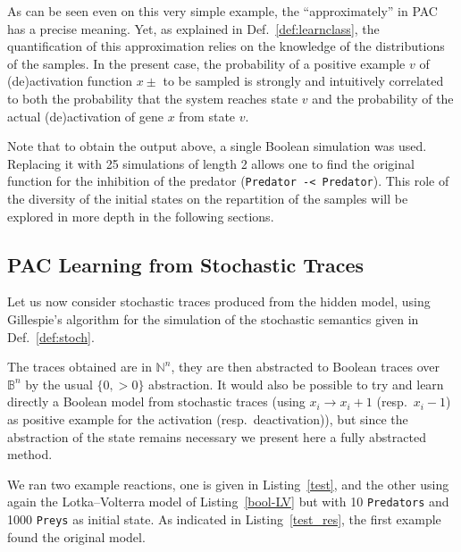 \documentclass{llncs}
\newcommand{\lra}{\longrightarrow}
\begin{document}
As can be seen even on this very simple example, the ``approximately'' in PAC has a precise meaning. Yet, as explained in Def.~\ref{def:learnclass}, the quantification of this approximation relies on the knowledge of the distributions of the samples.
%
In the present case, the probability of a positive example $v$ of (de)activation function $x\pm$ to be sampled is strongly and intuitively correlated to both the probability that the system reaches state $v$ and the probability of the actual (de)activation of gene $x$ from state $v$. 

Note that to obtain the output above, a single Boolean simulation was used.
Replacing it with 25 simulations of length 2 allows one to find the original
function for the inhibition of the predator (\texttt{Predator -< Predator}).
This role of the diversity of the initial states on the repartition of the
samples will be explored in more depth in the following sections.


\subsection{PAC Learning from Stochastic Traces}

Let us now consider stochastic traces %
produced from the hidden model, using Gillespie's
algorithm for the simulation of the stochastic semantics given in
Def.~\ref{def:stoch}.

The traces obtained are in ${\mathbb{N}}^n$, they are then abstracted to
Boolean traces over ${\mathbb{B}}^n$ by the usual $\{0, >0\}$ abstraction.
It would also be possible to try and learn directly a Boolean model from
stochastic traces (using $x_i\lra x_i+1$ (resp.\ $x_i-1$) as positive example for the
activation (resp.\ deactivation)), but since the abstraction of the state
remains necessary we present here a fully abstracted method.



We ran two example reactions, one is given in Listing~\ref{test}, and the
other using again the Lotka--Volterra model of Listing~\ref{bool-LV} but with 10
\texttt{Predators} and 1000 \texttt{Preys} as initial state.
As indicated in Listing~\ref{test_res}, the first example found the original
model.
\end{document}

